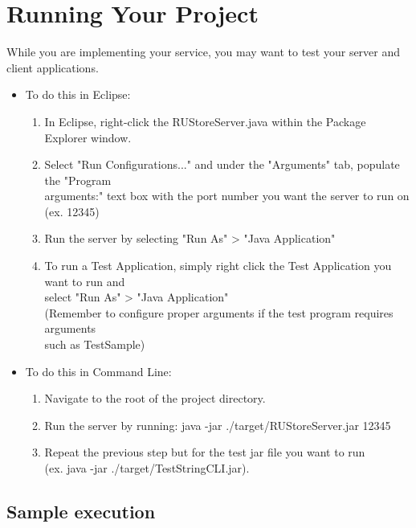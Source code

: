 \documentclass{article}
\begin{document}
\section{Running Your Project} %
\label{section:run}
While you are implementing your service, you may want to test your server and client applications. \\
\begin{itemize}
\item To do this in Eclipse:
	\begin{enumerate}
	\item In Eclipse, right-click the RUStoreServer.java within the Package Explorer window.
	\item Select "Run Configurations..." and under the "Arguments" tab, populate the "Program\\ arguments:" text box with the port number you want the server to run on (ex. 12345)
	\item Run the server by selecting "Run As" > "Java Application"
	\item To run a Test Application, simply right click the Test Application you want to run and\\ select "Run As" > "Java Application"\\ (Remember to configure proper arguments if the test program requires arguments\\ such as TestSample)
	\end{enumerate}
\item To do this in Command Line:
	\begin{enumerate}
	\item Navigate to the root of the project directory.
	\item Run the server by running: java -jar ./target/RUStoreServer.jar 12345
	\item Repeat the previous step but for the test jar file you want to run\\ (ex. java -jar ./target/TestStringCLI.jar).
	\end{enumerate}
\end{itemize}

\subsection*{Sample execution}
\end{document}
